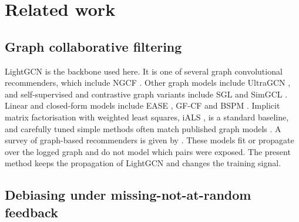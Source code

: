 \section{Related work}\label{sec:related}

\subsection{Graph collaborative filtering}

LightGCN \citep{he2020lightgcn} is the backbone used here. It is one of several graph
convolutional recommenders, which include NGCF \citep{wang2019ngcf}. Other graph models
include UltraGCN \citep{mao2021ultragcn}, and self-supervised and contrastive graph variants
include SGL \citep{wu2021sgl} and SimGCL \citep{yu2022simgcl}. Linear and closed-form models
include EASE \citep{steck2019ease}, GF-CF \citep{shen2021gfcf} and BSPM \citep{choi2023bspm}.
Implicit matrix factorisation with weighted least squares, iALS \citep{hu2008ials,rendle2022ials},
is a standard baseline, and carefully tuned simple methods often match published graph
models \citep{anelli2023myth}. A survey of graph-based recommenders is given by
\citet{wu2022gnnsurvey}. These models fit or propagate over the logged graph and do not
model which pairs were exposed. The present method keeps the propagation of LightGCN and
changes the training signal.

\subsection{Debiasing under missing-not-at-random feedback}

